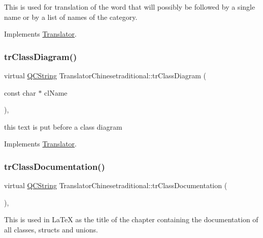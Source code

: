 This is used for translation of the word that will possibly be followed by a single name or by a list of names of the category. 

Implements \mbox{\hyperlink{class_translator}{Translator}}.

\mbox{\label{class_translator_chinesetraditional_a6f4b433d3229bfebfb764814f8399f41}} 
\subsubsection{\texorpdfstring{trClassDiagram()}{trClassDiagram()}}
{\footnotesize\ttfamily virtual \mbox{\hyperlink{class_q_c_string}{Q\+C\+String}} Translator\+Chinesetraditional\+::tr\+Class\+Diagram (\begin{DoxyParamCaption}\item[{const char $\ast$}]{cl\+Name }\end{DoxyParamCaption})\hspace{0.3cm}{\ttfamily [inline]}, {\ttfamily [virtual]}}

this text is put before a class diagram 

Implements \mbox{\hyperlink{class_translator}{Translator}}.

\mbox{\label{class_translator_chinesetraditional_a023c78624554447745aca5c07d76212f}} 
\subsubsection{\texorpdfstring{trClassDocumentation()}{trClassDocumentation()}}
{\footnotesize\ttfamily virtual \mbox{\hyperlink{class_q_c_string}{Q\+C\+String}} Translator\+Chinesetraditional\+::tr\+Class\+Documentation (\begin{DoxyParamCaption}{ }\end{DoxyParamCaption})\hspace{0.3cm}{\ttfamily [inline]}, {\ttfamily [virtual]}}

This is used in La\+TeX as the title of the chapter containing the documentation of all classes, structs and unions. 

